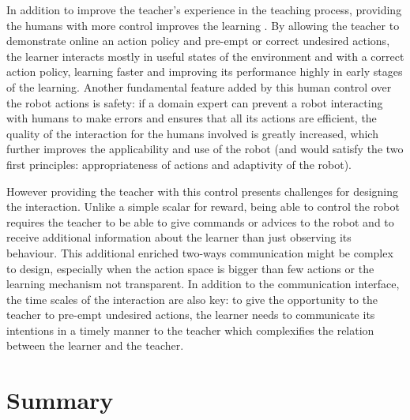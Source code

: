 In addition to improve the teacher's experience in the teaching process, providing the humans with more control improves the learning \citep{thomaz2008teachable,chernova2009interactive}. By allowing the teacher to demonstrate online an action policy and pre-empt or correct undesired actions, the learner interacts mostly in useful states of the environment and with a correct action policy, learning faster and improving its performance highly in early stages of the learning. Another fundamental feature added by this human control over the robot actions is safety: if a domain expert can prevent a robot interacting with humans to make errors and ensures that all its actions are efficient, the quality of the interaction for the humans involved is greatly increased, which further improves the applicability and use of the robot (and would satisfy the two first principles: appropriateness of actions and adaptivity of the robot).

However providing the teacher with this control presents challenges for designing the interaction. Unlike a simple scalar for reward, being able to control the robot requires the teacher to be able to give commands or advices to the robot and to receive additional information about the learner than just observing its behaviour. This additional enriched two-ways communication might be complex to design, especially when the action space is bigger than few actions or the learning mechanism not transparent. In addition to the communication interface, the time scales of the interaction are also key: to give the opportunity to the teacher to pre-empt undesired actions, the learner needs to communicate its intentions in a timely manner to the teacher which complexifies the relation between the learner and the teacher. %




\section{Summary}

